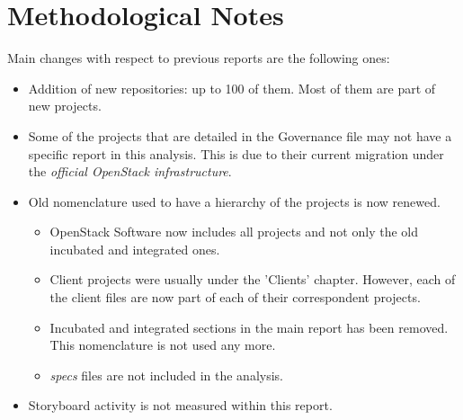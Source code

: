 \documentclass[a4wide,11pt]{report}
\begin{document}


\section{Methodological Notes}

Main changes with respect to previous reports are the following ones:

\begin{itemize}
\item Addition of new repositories: up to 100 of them. Most of them are part of new projects.
\item Some of the projects that are detailed in the Governance file may not have a specific report in this analysis. This is
due to their current migration under the \emph{official OpenStack infrastructure}.
\item Old nomenclature used to have a hierarchy of the projects is now renewed.
 \begin{itemize}
  \item OpenStack Software now includes all projects and not only the old incubated and integrated ones.
  \item Client projects were usually under the 'Clients' chapter. However, each of the client files are now part of each of their correspondent projects.
  \item Incubated and integrated sections in the main report has been removed. This nomenclature is not used any more.
  \item \emph{specs} files are not included in the analysis.
 \end{itemize}
\item Storyboard activity is not measured within this report.
\end{itemize}
\end{document}
